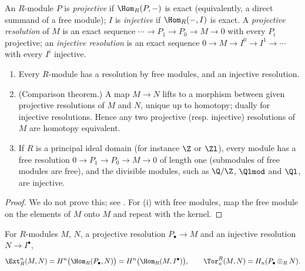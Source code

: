 \begin{definition}\label{def:cohomology:resolutions}
\sloppy An $R$-module $P$ is \emph{projective} if $\Hom_R(P,-)$ is exact (equivalently, a direct summand of a free module); $I$ is \emph{injective} if
$\Hom_R(-,I)$ is exact. A \emph{projective resolution} of $M$ is an exact sequence $\cdots\to P_1\to P_0\to M\to0$ with every $P_i$ projective; an
\emph{injective resolution} is an exact sequence $0\to M\to I^0\to I^1\to\cdots$ with every $I^i$ injective.
\end{definition}

\begin{proposition}\label{prop:cohomology:resolutions}
\begin{enumerate}[label=(\roman*)]
\item Every $R$-module has a resolution by free modules, and an injective resolution.
\item (Comparison theorem.) A map $M\to N$ lifts to a morphism between given projective resolutions of $M$ and $N$, unique up to homotopy; dually for
injective resolutions. Hence any two projective (resp. injective) resolutions of $M$ are homotopy equivalent.
\item If $R$ is a principal ideal domain (for instance $\Z$ or $\Zl$), every module has a free resolution $0\to P_1\to P_0\to M\to0$ of length one
(submodules of free modules are free), and the divisible modules, such as $\Q/\Z$, $\Qlmod$ and $\Ql$, are injective.
\end{enumerate}
\end{proposition}

\begin{proof}
We do not prove this; see \cite[Sections 2.2, 2.3]{Weibel}. For (i) with free modules, map the free module on the elements of $M$ onto $M$ and repeat with
the kernel.
\end{proof}

\begin{definition}\label{def:cohomology:ext-tor}
For $R$-modules $M$, $N$, a projective resolution $P_\bullet\to M$ and an injective resolution $N\to I^\bullet$,
\[
\Ext^n_R(M,N)=H^n\bigl(\Hom_R(P_\bullet,N)\bigr)=H^n\bigl(\Hom_R(M,I^\bullet)\bigr),\qquad \Tor_n^R(M,N)=H_n(P_\bullet\otimes_RN).
\]
\end{definition}

